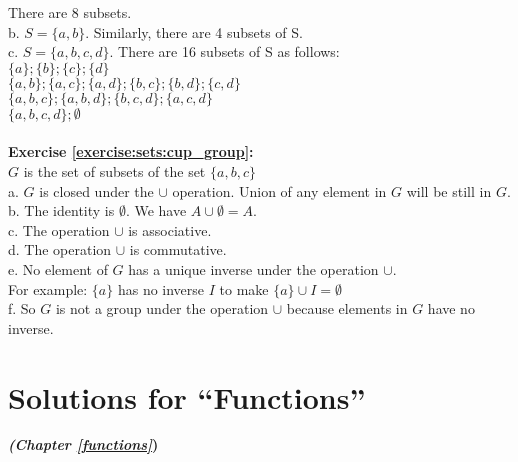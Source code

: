 There are 8 subsets.\\
b. $S=\{a,b\}$. Similarly, there are 4 subsets of S.\\
c. $S=\{a,b,c,d\}$. There are 16 subsets of S as follows:\\
$\{a\};\{b\};\{c\};\{d\}$\\
$\{a,b\};\{a,c\};\{a,d\};\{b,c\};\{b,d\};\{c,d\}$\\
$\{a,b,c\};\{a,b,d\};\{b,c,d\};\{a,c,d\}$\\
$\{a,b,c,d\};\emptyset$\\
\\
\textbf{Exercise \ref{exercise:sets:cup_group}:}\\
$G$ is the set of subsets of the set $\{a,b,c\}$\\
a. $G$ is closed under the $\cup$ operation. Union of any element in $G$ will be still in $G$.\\
b. The identity is $\emptyset$. We have $A\cup \emptyset=A$.\\
c. The operation $\cup$ is associative.\\
d. The operation $\cup$ is commutative.\\
e. No element of $G$ has a unique inverse under the operation $\cup$.\\
For example: $\{a\}$ has no inverse $I$ to make $\{a\}\cup I=\emptyset$\\
f. So $G$ is not a group under the operation $\cup$ because elements in $G$ have no inverse.\\

\section{Solutions for ``Functions''}
\noindent\textbf{\textit{ (Chapter \ref{functions}})}\bigskip

